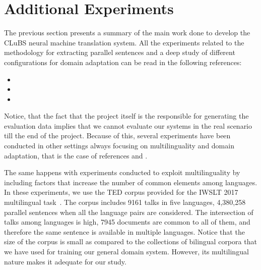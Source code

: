 \documentclass[a4paper,11pt]{article}
\begin{document}


\section{Additional Experiments}
\label{s:moreExperiments}

The previous section presents a summary of the main work done to develop the CLuBS neural machine translation system. All the experiments related to the methodology for extracting parallel sentences and a deep study of different configurations for domain adaptation can be read in the following references:
\begin{itemize}
 \item[\cite{EspanaBarron:2017}] 
 \item[\cite{espanaEtAl:2017}] 
 \item[\cite{tesisAdam}] 
\end{itemize}


Notice, that the fact that the project itself is the responsible for generating the evaluation data implies that we cannot evaluate our systems in the real scenario till the end of the project. Because of this, several experiments have been conducted in other settings always focusing on multilinguality and domain adaptation, that is the case of references \cite{EspanaBarron:2017} and \cite{espanaEtAl:2017}.  

The same happens with experiments conducted to exploit multilinguality by including factors that increase the number of common elements among languages. In these experiments, we use the TED corpus provided for the IWSLT 2017 multilingual task~\cite{iwslt-overview:2017}. The corpus includes 9161 talks in five languages, 4,380,258 parallel sentences when all the language pairs are considered. The intersection of talks among languages is high, 7945 documents are common to all of them, and therefore the same sentence is available in multiple languages.  Notice that the size of the corpus is small as compared to the collections of bilingual corpora that we have used for training our general domain system. However, its multilingual nature makes it adequate for our study.
\end{document}
